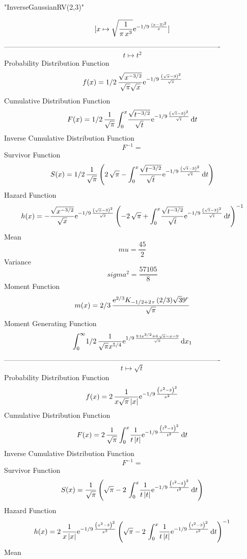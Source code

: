 \documentclass[12pt]{article}
\begin{document}
 
                          "InverseGaussianRV(2,3)"

$$[x\mapsto \sqrt {{\frac {1}{\pi\,{x}^{3}}}}{{\rm e}^{-1/9\,{\frac {
 \left( x-3 \right) ^{2}}{x}}}}]
$$-------------------------------------------------------------------------------------------  \\$$t\mapsto {t}^{2}
$$Probability Distribution Function 
$$  f(x)=1/2\,{\frac {\sqrt {{x}^{-3/2}}}{\sqrt {\pi}\sqrt {x}}{{\rm e}^{-1/9\,
{\frac { \left( \sqrt {x}-3 \right) ^{2}}{\sqrt {x}}}}}}
$$Cumulative Distribution Function  
 $$F(x)=1/2\,{\frac {1}{\sqrt {\pi}}\int_{0}^{x}\!{\frac {\sqrt {{t}^{-3/2}}}{
\sqrt {t}}{{\rm e}^{-1/9\,{\frac { \left( \sqrt {t}-3 \right) ^{2}}{
\sqrt {t}}}}}}\,{\rm d}t}
$$ Inverse Cumulative Distribution Function 
  $$F^{-1} = $$Survivor Function 
 $$ S(x)=1/2\,{\frac {1}{\sqrt {\pi}} \left( 2\,\sqrt {\pi}-\int_{0}^{x}\!{
\frac {\sqrt {{t}^{-3/2}}}{\sqrt {t}}{{\rm e}^{-1/9\,{\frac { \left( 
\sqrt {t}-3 \right) ^{2}}{\sqrt {t}}}}}}\,{\rm d}t \right) }
$$ Hazard Function 
 $$ h(x)=-{\frac {\sqrt {{x}^{-3/2}}}{\sqrt {x}}{{\rm e}^{-1/9\,{\frac {
 \left( \sqrt {x}-3 \right) ^{2}}{\sqrt {x}}}}} \left( -2\,\sqrt {\pi}
+\int_{0}^{x}\!{\frac {\sqrt {{t}^{-3/2}}}{\sqrt {t}}{{\rm e}^{-1/9\,{
\frac { \left( \sqrt {t}-3 \right) ^{2}}{\sqrt {t}}}}}}\,{\rm d}t
 \right) ^{-1}}
$$Mean 
 $$ mu={\frac{45}{2}}
$$ Variance 
 $$ sigma^2 = {\frac{57105}{8}}
$$Moment Function 
 $$ m(x) = 2/3\,{\frac {{{\rm e}^{2/3}}{{\sl K}_{-1/2+2\,r}\left(2/3\right)}
\sqrt {3}{9}^{r}}{\sqrt {\pi}}}
$$ Moment Generating Function 
 $$\int_{0}^{\infty }\!1/2\,{\frac {1}{\sqrt {\pi}{x}^{5/4}}{{\rm e}^{1/9
\,{\frac {9\,t{x}^{3/2}+6\,\sqrt {x}-x-9}{\sqrt {x}}}}}}\,{\rm d}x_{{1
}}
$$-------------------------------------------------------------------------------------------  \\$$t\mapsto \sqrt {t}
$$Probability Distribution Function 
$$  f(x)=2\,{\frac {1}{x\sqrt {\pi} \left| x \right| }{{\rm e}^{-1/9\,{\frac {
 \left( {x}^{2}-3 \right) ^{2}}{{x}^{2}}}}}}
$$Cumulative Distribution Function  
 $$F(x)=2\,{\frac {1}{\sqrt {\pi}}\int_{0}^{x}\!{\frac {1}{t \left| t \right| 
}{{\rm e}^{-1/9\,{\frac { \left( {t}^{2}-3 \right) ^{2}}{{t}^{2}}}}}}
\,{\rm d}t}
$$ Inverse Cumulative Distribution Function 
  $$F^{-1} = $$Survivor Function 
 $$ S(x)={\frac {1}{\sqrt {\pi}} \left( \sqrt {\pi}-2\,\int_{0}^{x}\!{\frac {1
}{t \left| t \right| }{{\rm e}^{-1/9\,{\frac { \left( {t}^{2}-3
 \right) ^{2}}{{t}^{2}}}}}}\,{\rm d}t \right) }
$$ Hazard Function 
 $$ h(x)=2\,{\frac {1}{x \left| x \right| }{{\rm e}^{-1/9\,{\frac { \left( {x}^
{2}-3 \right) ^{2}}{{x}^{2}}}}} \left( \sqrt {\pi}-2\,\int_{0}^{x}\!{
\frac {1}{t \left| t \right| }{{\rm e}^{-1/9\,{\frac { \left( {t}^{2}-
3 \right) ^{2}}{{t}^{2}}}}}}\,{\rm d}t \right) ^{-1}}
$$Mean 
\end{document}
